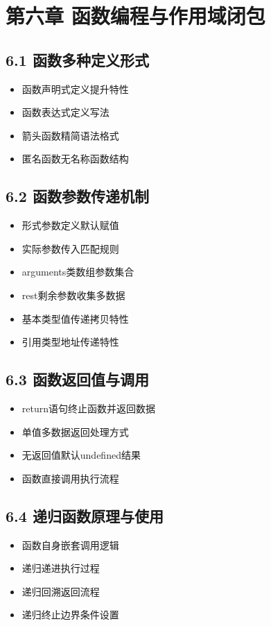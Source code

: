 \section{第六章 函数编程与作用域闭包}
\subsection{6.1 函数多种定义形式}
\begin{itemize}
\item 函数声明式定义提升特性
\item 函数表达式定义写法
\item 箭头函数精简语法格式
\item 匿名函数无名称函数结构
\end{itemize}

\subsection{6.2 函数参数传递机制}
\begin{itemize}
\item 形式参数定义默认赋值
\item 实际参数传入匹配规则
\item arguments类数组参数集合
\item rest剩余参数收集多数据
\item 基本类型值传递拷贝特性
\item 引用类型地址传递特性
\end{itemize}

\subsection{6.3 函数返回值与调用}
\begin{itemize}
\item return语句终止函数并返回数据
\item 单值多数据返回处理方式
\item 无返回值默认undefined结果
\item 函数直接调用执行流程
\end{itemize}

\subsection{6.4 递归函数原理与使用}
\begin{itemize}
\item 函数自身嵌套调用逻辑
\item 递归递进执行过程
\item 递归回溯返回流程
\item 递归终止边界条件设置
\end{itemize}

